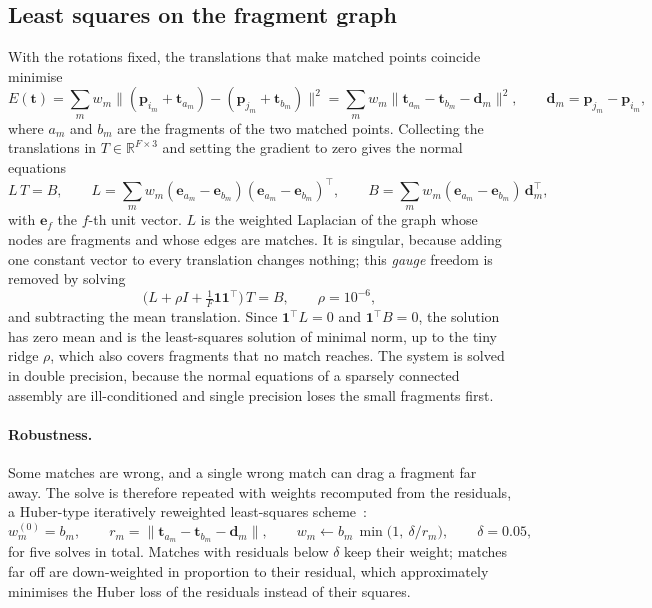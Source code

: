 \documentclass[11pt,a4paper]{article}
\theoremstyle{remark}
\newcommand{\R}{\mathbb{R}}
\newcommand{\T}{^{\top}}
\begin{document}
\subsection{Least squares on the fragment graph}
With the rotations fixed, the translations that make matched points coincide minimise
\begin{equation}
  E(\mathbf t)=\sum_m w_m\big\lVert(\mathbf p_{i_m}+\mathbf t_{a_m})-(\mathbf p_{j_m}+\mathbf t_{b_m})\big\rVert^2
  =\sum_m w_m\big\lVert\mathbf t_{a_m}-\mathbf t_{b_m}-\mathbf d_m\big\rVert^2,\qquad \mathbf d_m=\mathbf p_{j_m}-\mathbf p_{i_m},
\end{equation}
where $a_m$ and $b_m$ are the fragments of the two matched points. Collecting the translations in $T\in\R^{F\times3}$ and setting the gradient to zero gives the normal equations
\begin{equation}
  L\,T=B,\qquad
  L=\sum_m w_m(\mathbf e_{a_m}-\mathbf e_{b_m})(\mathbf e_{a_m}-\mathbf e_{b_m})\T,\qquad
  B=\sum_m w_m(\mathbf e_{a_m}-\mathbf e_{b_m})\,\mathbf d_m\T,
\end{equation}
with $\mathbf e_f$ the $f$-th unit vector. $L$ is the weighted Laplacian of the graph whose nodes are fragments and whose edges are matches. It is singular, because adding one constant vector to every translation changes nothing; this \emph{gauge} freedom is removed by solving
\begin{equation}
  \Big(L+\rho I+\tfrac1F\mathbf 1\mathbf 1\T\Big)\,T=B,\qquad \rho=10^{-6},
\end{equation}
and subtracting the mean translation. Since $\mathbf 1\T L=0$ and $\mathbf 1\T B=0$, the solution has zero mean and is the least-squares solution of minimal norm, up to the tiny ridge $\rho$, which also covers fragments that no match reaches. The system is solved in double precision, because the normal equations of a sparsely connected assembly are ill-conditioned and single precision loses the small fragments first.

\paragraph{Robustness.} Some matches are wrong, and a single wrong match can drag a fragment far away. The solve is therefore repeated with weights recomputed from the residuals, a Huber-type iteratively reweighted least-squares scheme~\cite{huber1964robust}:
\begin{equation}
  w_m^{(0)}=b_m,\qquad r_m=\big\lVert\mathbf t_{a_m}-\mathbf t_{b_m}-\mathbf d_m\big\rVert,\qquad
  w_m\leftarrow b_m\,\min\!\big(1,\ \delta/r_m\big),\qquad\delta=0.05,
\end{equation}
for five solves in total. Matches with residuals below $\delta$ keep their weight; matches far off are down-weighted in proportion to their residual, which approximately minimises the Huber loss of the residuals instead of their squares.
\end{document}
